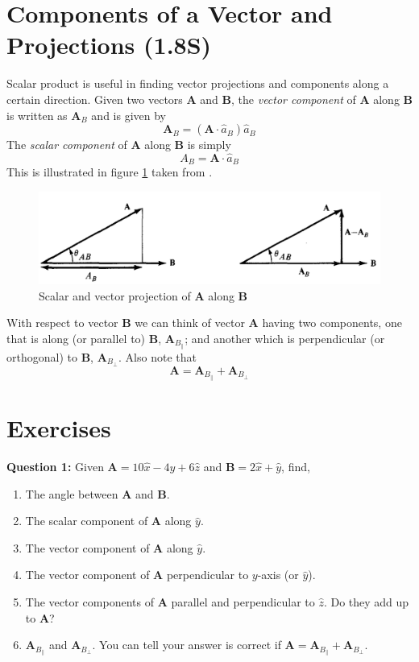 \documentclass[12pt,a4paper]{article}
\begin{document}
\section{Components of a Vector and Projections (1.8S)}
Scalar product is useful in finding vector projections and components along a certain direction. Given two vectors \textbf{A} and \textbf{B}, the \textit{vector component} of \textbf{A} along \textbf{B} is written as $\textbf{A}_B$ and is given by
\begin{equation}
\textbf{A}_B=(\textbf{A}\cdot \hat{a}_B)\hat{a}_B
\end{equation}
The \textit{scalar component} of \textbf{A} along \textbf{B} is simply
\begin{equation}
A_B=\textbf{A}\cdot \hat{a}_B
\end{equation}
This is illustrated in figure \ref{Scalar-vector-projections} taken from \cite[Figure 1.10, page 16]{Sadiku}.
\begin{figure}[H]
\includegraphics[scale=0.48]{Figure1-10S.png}
\caption{Scalar and vector projection of \textbf{A} along \textbf{B} \cite[Figure 1.10, page 16]{Sadiku}}
\label{Scalar-vector-projections}
\end{figure}
With respect to vector \textbf{B} we can think of vector \textbf{A} having two components, one that is along (or parallel to) \textbf{B}, $\textbf{A}_{B_\parallel}$; and another which is perpendicular (or orthogonal) to \textbf{B}, $\textbf{A}_{B_\perp}$. Also note that
\begin{equation}
\textbf{A}=\textbf{A}_{B_\parallel}+\textbf{A}_{B_\perp}
\end{equation}

\section{Exercises}
\noindent\textbf{Question 1:} Given $\textbf{A}=10\hat x-4\hat y+6\hat z$ and $\textbf{B}=2\hat x+\hat y$, find,
\begin{enumerate}
\item[(1)] The angle between \textbf{A} and \textbf{B}.
\item[(2)] The scalar component of \textbf{A} along $\hat y$.
\item[(3)] The vector component of \textbf{A} along $\hat y$.
\item[(4)] The vector component of \textbf{A} perpendicular to $y$-axis (or $\hat y$).
\item[(5)] The vector components of \textbf{A} parallel and perpendicular to $\hat z$. Do they add up to \textbf{A}?
\item[(6)] $\textbf{A}_{B_\parallel}$ and $\textbf{A}_{B_\perp}$. You can tell your answer is correct if $\textbf{A}=\textbf{A}_{B_\parallel}+\textbf{A}_{B_\perp}$.
\end{enumerate}
\end{document}
